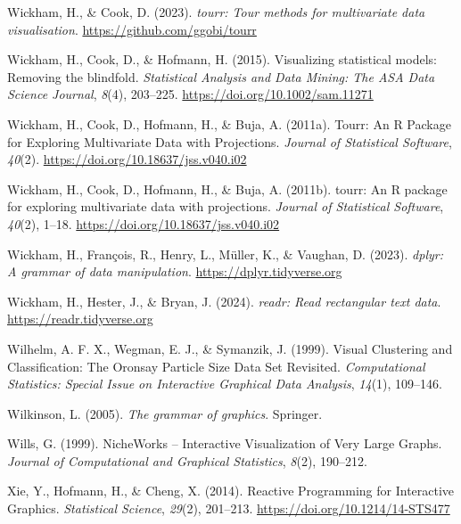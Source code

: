 \documentclass[
  letterpaper,
]{krantz}
\newlength{\cslhangindent}
\newenvironment{CSLReferences}[2] %
 {\begin{list}{}{%
  \setlength{\itemindent}{0pt}
  \setlength{\leftmargin}{0pt}
  \setlength{\parsep}{0pt}
  \ifodd #1
   \setlength{\leftmargin}{\cslhangindent}
   \setlength{\itemindent}{-1\cslhangindent}
  \fi
  \setlength{\itemsep}{#2\baselineskip}}}
 {\end{list}}
\begin{document}
\begin{CSLReferences}{1}{0}
Wickham, H., \& Cook, D. (2023). \emph{{tourr}: Tour methods for
multivariate data visualisation}. \url{https://github.com/ggobi/tourr}

Wickham, H., Cook, D., \& Hofmann, H. (2015). Visualizing statistical
models: Removing the blindfold. \emph{Statistical Analysis and Data
Mining: The ASA Data Science Journal}, \emph{8}(4), 203--225.
\url{https://doi.org/10.1002/sam.11271}

Wickham, H., Cook, D., Hofmann, H., \& Buja, A. (2011a). Tourr: {An} {R}
{Package} for {Exploring} {Multivariate} {Data} with {Projections}.
\emph{Journal of Statistical Software}, \emph{40}(2).
\url{https://doi.org/10.18637/jss.v040.i02}

Wickham, H., Cook, D., Hofmann, H., \& Buja, A. (2011b). {tourr}: An {R}
package for exploring multivariate data with projections. \emph{Journal
of Statistical Software}, \emph{40}(2), 1--18.
\url{https://doi.org/10.18637/jss.v040.i02}

Wickham, H., François, R., Henry, L., Müller, K., \& Vaughan, D. (2023).
\emph{{dplyr}: A grammar of data manipulation}.
\url{https://dplyr.tidyverse.org}

Wickham, H., Hester, J., \& Bryan, J. (2024). \emph{{readr}: Read
rectangular text data}. \url{https://readr.tidyverse.org}

Wilhelm, A. F. X., Wegman, E. J., \& Symanzik, J. (1999). Visual
{C}lustering and {C}lassification: {T}he {O}ronsay {P}article {S}ize
{D}ata {S}et {R}evisited. \emph{Computational Statistics: Special Issue
on Interactive Graphical Data Analysis}, \emph{14}(1), 109--146.

Wilkinson, L. (2005). \emph{The grammar of graphics}. Springer.

Wills, G. (1999). NicheWorks -- {I}nteractive {V}isualization of {V}ery
{L}arge {G}raphs. \emph{Journal of Computational and Graphical
Statistics}, \emph{8}(2), 190--212.

Xie, Y., Hofmann, H., \& Cheng, X. (2014). {Reactive Programming for
Interactive Graphics}. \emph{Statistical Science}, \emph{29}(2),
201--213. \url{https://doi.org/10.1214/14-STS477}


\end{CSLReferences}
\end{document}
